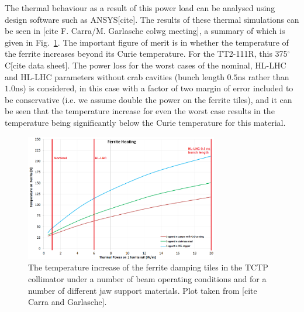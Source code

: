 The thermal behaviour as a result of this power load can be analysed using design software such as ANSYS[cite]. The results of these thermal simulations can be seen in [cite F. Carra/M. Garlasche colwg meeting], a summary of which is given in Fig.~\ref{fig:tctp-ferrite-temp-rise}. The important figure of merit is in whether the temperature of the ferrite increases beyond its Curie temperature. For the TT2-111R, this 375$^{\circ}$C[cite data sheet]. The power loss for the worst cases of the nominal, HL-LHC and HL-LHC parameters without crab cavities (bunch length $0.5$ns rather than $1.0$ns) is considered, in this case with a factor of two margin of error included to be conservative (i.e. we assume double the power on the ferrite tiles), and it can be seen that the temperature increase for even the worst case results in the temperature being significantly below the Curie temperature for this material.

\begin{figure}
\begin{center}
\includegraphics[width=0.75\textwidth]{LHC_Collimation_Upgrades/figures/temp_increase_tctp_col.png}
\end{center}
\label{fig:tctp-ferrite-temp-rise}
\caption{The temperature increase of the ferrite damping tiles in the TCTP collimator under a number of beam operating conditions and for a number of different jaw support materials. Plot taken from [cite Carra and Garlasche].}
\end{figure}
